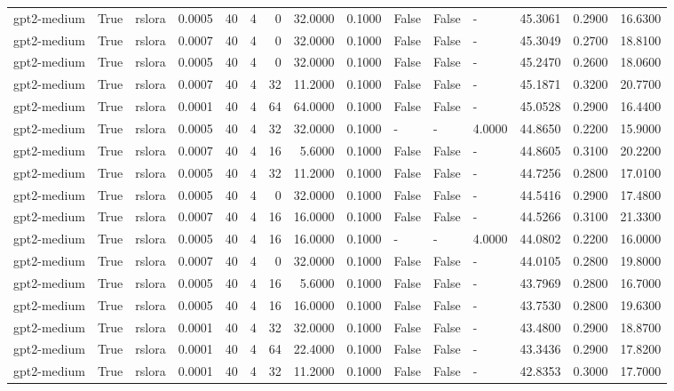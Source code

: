 \begin{tabular}{lrlrrrrrrlllrrr}
gpt2-medium & True & rslora & 0.0005 & 40 & 4 & 0 & 32.0000 & 0.1000 & False & False & - & 45.3061 & 0.2900 & 16.6300 \\
gpt2-medium & True & rslora & 0.0007 & 40 & 4 & 0 & 32.0000 & 0.1000 & False & False & - & 45.3049 & 0.2700 & 18.8100 \\
gpt2-medium & True & rslora & 0.0005 & 40 & 4 & 0 & 32.0000 & 0.1000 & False & False & - & 45.2470 & 0.2600 & 18.0600 \\
gpt2-medium & True & rslora & 0.0007 & 40 & 4 & 32 & 11.2000 & 0.1000 & False & False & - & 45.1871 & 0.3200 & 20.7700 \\
gpt2-medium & True & rslora & 0.0001 & 40 & 4 & 64 & 64.0000 & 0.1000 & False & False & - & 45.0528 & 0.2900 & 16.4400 \\
gpt2-medium & True & rslora & 0.0005 & 40 & 4 & 32 & 32.0000 & 0.1000 & - & - & 4.0000 & 44.8650 & 0.2200 & 15.9000 \\
gpt2-medium & True & rslora & 0.0007 & 40 & 4 & 16 & 5.6000 & 0.1000 & False & False & - & 44.8605 & 0.3100 & 20.2200 \\
gpt2-medium & True & rslora & 0.0005 & 40 & 4 & 32 & 11.2000 & 0.1000 & False & False & - & 44.7256 & 0.2800 & 17.0100 \\
gpt2-medium & True & rslora & 0.0005 & 40 & 4 & 0 & 32.0000 & 0.1000 & False & False & - & 44.5416 & 0.2900 & 17.4800 \\
gpt2-medium & True & rslora & 0.0007 & 40 & 4 & 16 & 16.0000 & 0.1000 & False & False & - & 44.5266 & 0.3100 & 21.3300 \\
gpt2-medium & True & rslora & 0.0005 & 40 & 4 & 16 & 16.0000 & 0.1000 & - & - & 4.0000 & 44.0802 & 0.2200 & 16.0000 \\
gpt2-medium & True & rslora & 0.0007 & 40 & 4 & 0 & 32.0000 & 0.1000 & False & False & - & 44.0105 & 0.2800 & 19.8000 \\
gpt2-medium & True & rslora & 0.0005 & 40 & 4 & 16 & 5.6000 & 0.1000 & False & False & - & 43.7969 & 0.2800 & 16.7000 \\
gpt2-medium & True & rslora & 0.0005 & 40 & 4 & 16 & 16.0000 & 0.1000 & False & False & - & 43.7530 & 0.2800 & 19.6300 \\
gpt2-medium & True & rslora & 0.0001 & 40 & 4 & 32 & 32.0000 & 0.1000 & False & False & - & 43.4800 & 0.2900 & 18.8700 \\
gpt2-medium & True & rslora & 0.0001 & 40 & 4 & 64 & 22.4000 & 0.1000 & False & False & - & 43.3436 & 0.2900 & 17.8200 \\
gpt2-medium & True & rslora & 0.0001 & 40 & 4 & 32 & 11.2000 & 0.1000 & False & False & - & 42.8353 & 0.3000 & 17.7000 \\

\end{tabular}
